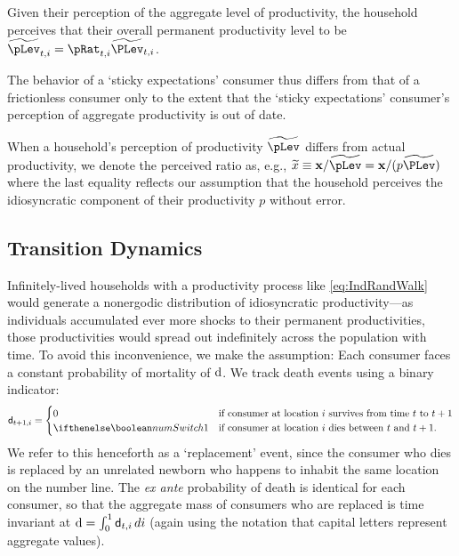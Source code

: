 \documentclass[titlepage]{\econtex}
\begin{document}
Given their perception of the aggregate level of productivity, the household perceives that their overall permanent productivity level to be $\perc{\pLev}_{t,i} = \pRat_{t,i} \perc{\PLev}_{t,i}$.

The behavior of a `sticky expectations' consumer thus differs from that of a frictionless consumer only to the extent that the `sticky expectations' consumer's perception of aggregate productivity is out of date.

When a household's perception of productivity $\perc{\pLev}$ differs from actual productivity, we denote the perceived ratio as, e.g., $\perc{x} \equiv \mathbf{x}/\perc{\pLev} = \mathbf{x}/({p}\perc{\PLev})$ where the last equality reflects our assumption that the household perceives the idiosyncratic component of their productivity ${p}$ without error.


\subsection{Transition Dynamics}

Infinitely-lived households with a productivity process like \eqref{eq:IndRandWalk} would generate a nonergodic distribution of idiosyncratic productivity---as individuals accumulated ever more shocks to their permanent productivities, those productivities would spread out indefinitely across the population with time. To avoid this inconvenience, we make the \cite{blanchardFinite} assumption: Each consumer faces a constant probability of mortality of $\mathrm{d}$. %
We track death events using a binary indicator:
\begin{equation*}
\pDies_{t+1,i} =
  \begin{cases}
    0 & \text{if consumer at location $i$ survives from time $t$ to $t+1$}
\\ \ifnumSw  1 & \text{if consumer at location $i$ dies between $t$ and $t+1$}.
  \end{cases}
\end{equation*}
We refer to this henceforth as a `replacement' event, since the consumer who dies is replaced by an unrelated newborn who happens to inhabit the same location on the number line.  The {\it ex ante} probability of death is identical for each consumer, so that the aggregate mass of consumers who are replaced is time invariant at $\mathrm{d} = \int_{0}^{1} \mathsf{d}_{t,i}\,di$ (again using the notation that capital letters represent aggregate values).
\end{document}
